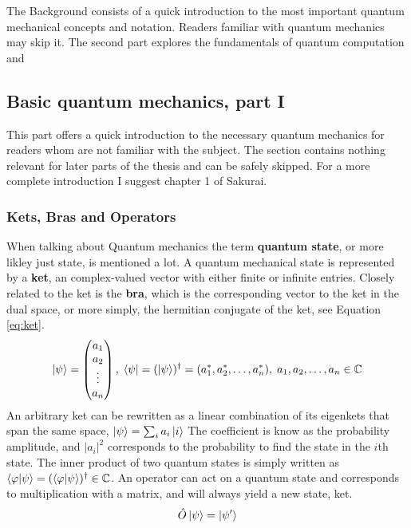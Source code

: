 The Background consists of a quick introduction to the most important quantum mechanical concepts and notation. Readers familiar with quantum mechanics may skip it. The second part explores the fundamentals of quantum computation and 

\subsection{Basic quantum mechanics, part I}
This part offers a quick introduction to the necessary  quantum mechanics for readers whom are not familiar with the subject. The section contains nothing relevant for later parts of the thesis and can be safely skipped. For a more complete introduction I suggest chapter 1 of Sakurai.

\subsubsection{Kets, Bras and Operators}
When talking about Quantum mechanics the term \textbf{quantum state}, or more likley just state, is mentioned a lot. A quantum mechanical state is represented by a \textbf{ket}, an complex-valued vector with either finite or infinite entries. Closely related to the ket is the \textbf{bra}, which is the corresponding vector to the ket in the dual space, or more simply, the hermitian conjugate of the ket, see Equation \ref{eq:ket}.
\begin{equation}
\label{eq:ket}
\ket{\psi} = \begin{pmatrix}
a_1 \\ a_2 \\ \vdots \\ a_n
\end{pmatrix},\;
\bra{\psi} = (\ket{\psi})^{\dagger} = (a_1^{*}, a_2^{*}, \dots, a_n^{*}),\; a_1,a_2,\dots,a_n \in \mathbb{C}
\end{equation} 
An arbitrary ket can be rewritten as a linear combination of its eigenkets that span the same space, $\ket{\psi} = \sum_i a_i\ket{i}$ The coefficient is know as the probability amplitude, and $|a_i|^2$ corresponds to the probability to find the state in the $i$th state. 
The inner product of two quantum states is simply written as 
$\bra{\varphi}\ket{\psi} = (\bra{\varphi}\ket{\psi})^\dagger \in \mathbb{C}$. 
An operator can act on a quantum state and corresponds to multiplication with a matrix, and will always yield a new state, ket. 
\begin{equation}
\hat{O}\ket{\psi} = \ket{\psi'}
\end{equation}
